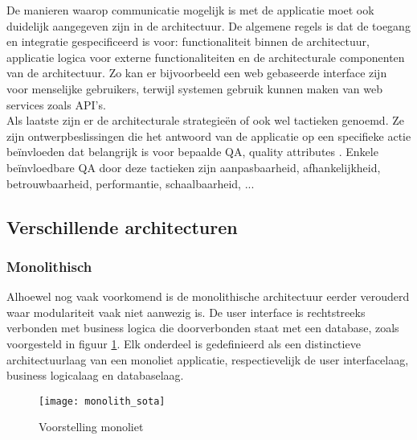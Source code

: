 \bigskip

De manieren waarop communicatie mogelijk is met de applicatie moet ook duidelijk aangegeven zijn in de architectuur. De algemene regels is dat de toegang en integratie gespecificeerd is voor: functionaliteit binnen de architectuur, applicatie logica voor externe functionaliteiten en de architecturale componenten van de architectuur. Zo kan er bijvoorbeeld een web gebaseerde interface zijn voor menselijke gebruikers, terwijl systemen gebruik kunnen maken van web services zoals API's.\\

Als laatste zijn er de architecturale strategieën of ook wel tactieken genoemd. Ze zijn  ontwerpbeslissingen die het antwoord van de applicatie op een specifieke actie beïnvloeden dat belangrijk is voor bepaalde QA, quality attributes \autocite{Marquez2023}. Enkele beïnvloedbare QA door deze tactieken zijn aanpasbaarheid, afhankelijkheid, betrouwbaarheid, performantie, schaalbaarheid, ...

\subsection{Verschillende architecturen} \label{sota-title-architecturen}
\subsubsection{Monolithisch}
Alhoewel nog vaak voorkomend is de monolithische architectuur eerder verouderd waar modulariteit vaak niet aanwezig is\autocite{Megargel2020}. De user interface is rechtstreeks verbonden met business logica die doorverbonden staat met een database, zoals voorgesteld in figuur \ref{monolith_sota}. Elk onderdeel is gedefinieerd als een distinctieve architectuurlaag van een monoliet applicatie, respectievelijk de user interfacelaag, business logicalaag en databaselaag. \\

\begin{figure}[H]
    \texttt{[image: monolith\_sota]}
    \centering
    \caption{Voorstelling monoliet \autocite{Megargel2020}}
    \label{monolith_sota}
\end{figure}


